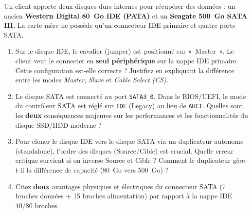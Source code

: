 \documentclass[11pt]{article}
\begin{document}
\begin{exercice}
Un client apporte deux disques durs internes pour récupérer des données : un ancien \textbf{Western Digital 80~Go IDE (PATA)} et un \textbf{Seagate 500~Go SATA III}. La carte mère ne possède qu'un connecteur IDE primaire et quatre ports SATA.
\begin{enumerate}
    \item Sur le disque IDE, le cavalier (jumper) est positionné sur «~Master~». Le client veut le connecter en \textbf{seul périphérique} sur la nappe IDE primaire. Cette configuration est-elle correcte ? Justifiez en expliquant la différence entre les modes \textit{Master}, \textit{Slave} et \textit{Cable Select (CS)}.
    \item Le disque SATA est connecté au port \texttt{SATA3\_0}. Dans le BIOS/UEFI, le mode du contrôleur SATA est réglé sur \texttt{IDE} (Legacy) au lieu de \texttt{AHCI}. Quelles sont les \textbf{deux} conséquences majeures sur les performances et les fonctionnalités du disque SSD/HDD moderne ?
    \item Pour cloner le disque IDE vers le disque SATA via un duplicateur autonome (standalone), l'ordre des disques (Source/Cible) est crucial. Quelle erreur critique survient si on inverse Source et Cible ? Comment le duplicateur gère-t-il la différence de capacité (80~Go vers 500~Go) ?
    \item Citez \textbf{deux} avantages physiques et électriques du connecteur SATA (7 broches données + 15 broches alimentation) par rapport à la nappe IDE 40/80 broches.
\end{enumerate}
\end{exercice}
\end{document}
